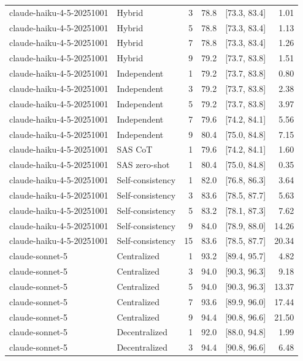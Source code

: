 \begin{tabular}{@{}llrrrr@{}}
claude-haiku-4-5-20251001 & Hybrid & 3 & 78.8 & [73.3, 83.4] & 1.01 \\
claude-haiku-4-5-20251001 & Hybrid & 5 & 78.8 & [73.3, 83.4] & 1.13 \\
claude-haiku-4-5-20251001 & Hybrid & 7 & 78.8 & [73.3, 83.4] & 1.26 \\
claude-haiku-4-5-20251001 & Hybrid & 9 & 79.2 & [73.7, 83.8] & 1.51 \\
claude-haiku-4-5-20251001 & Independent & 1 & 79.2 & [73.7, 83.8] & 0.80 \\
claude-haiku-4-5-20251001 & Independent & 3 & 79.2 & [73.7, 83.8] & 2.38 \\
claude-haiku-4-5-20251001 & Independent & 5 & 79.2 & [73.7, 83.8] & 3.97 \\
claude-haiku-4-5-20251001 & Independent & 7 & 79.6 & [74.2, 84.1] & 5.56 \\
claude-haiku-4-5-20251001 & Independent & 9 & 80.4 & [75.0, 84.8] & 7.15 \\
claude-haiku-4-5-20251001 & SAS CoT & 1 & 79.6 & [74.2, 84.1] & 1.60 \\
claude-haiku-4-5-20251001 & SAS zero-shot & 1 & 80.4 & [75.0, 84.8] & 0.35 \\
claude-haiku-4-5-20251001 & Self-consistency & 1 & 82.0 & [76.8, 86.3] & 3.64 \\
claude-haiku-4-5-20251001 & Self-consistency & 3 & 83.6 & [78.5, 87.7] & 5.63 \\
claude-haiku-4-5-20251001 & Self-consistency & 5 & 83.2 & [78.1, 87.3] & 7.62 \\
claude-haiku-4-5-20251001 & Self-consistency & 9 & 84.0 & [78.9, 88.0] & 14.26 \\
claude-haiku-4-5-20251001 & Self-consistency & 15 & 83.6 & [78.5, 87.7] & 20.34 \\
claude-sonnet-5 & Centralized & 1 & 93.2 & [89.4, 95.7] & 4.82 \\
claude-sonnet-5 & Centralized & 3 & 94.0 & [90.3, 96.3] & 9.18 \\
claude-sonnet-5 & Centralized & 5 & 94.0 & [90.3, 96.3] & 13.37 \\
claude-sonnet-5 & Centralized & 7 & 93.6 & [89.9, 96.0] & 17.44 \\
claude-sonnet-5 & Centralized & 9 & 94.4 & [90.8, 96.6] & 21.50 \\
claude-sonnet-5 & Decentralized & 1 & 92.0 & [88.0, 94.8] & 1.99 \\
claude-sonnet-5 & Decentralized & 3 & 94.4 & [90.8, 96.6] & 6.48 \\

\end{tabular}
